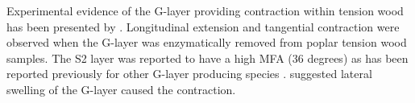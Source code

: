 Experimental evidence of the G-layer providing contraction within tension wood
has been presented by \cite{Goswami_2008}. Longitudinal extension and tangential
contraction were observed when the G-layer was enzymatically removed from
poplar tension wood samples. The S2 layer was reported to have a high MFA (36
degrees) as has been reported previously for other G-layer producing species
\cite{M_ller_2006}. \cite{Goswami_2008} suggested lateral swelling of the G-layer caused the
contraction.
